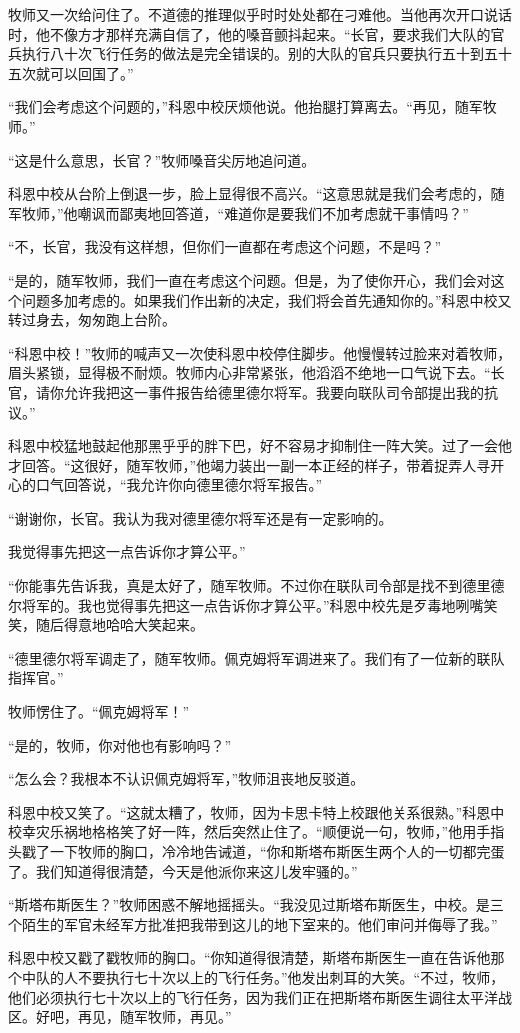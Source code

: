     牧师又一次给问住了。不道德的推理似乎时时处处都在刁难他。当他再次开口说话时，他不像方才那样充满自信了，他的嗓音颤抖起来。“长官，要求我们大队的官兵执行八十次飞行任务的做法是完全错误的。别的大队的官兵只要执行五十到五十五次就可以回国了。”

    “我们会考虑这个问题的，”科恩中校厌烦他说。他抬腿打算离去。“再见，随军牧师。”

    “这是什么意思，长官？”牧师嗓音尖厉地追问道。

    科恩中校从台阶上倒退一步，脸上显得很不高兴。“这意思就是我们会考虑的，随军牧师，”他嘲讽而鄙夷地回答道，“难道你是要我们不加考虑就干事情吗？”

    “不，长官，我没有这样想，但你们一直都在考虑这个问题，不是吗？”

    “是的，随军牧师，我们一直在考虑这个问题。但是，为了使你开心，我们会对这个问题多加考虑的。如果我们作出新的决定，我们将会首先通知你的。”科恩中校又转过身去，匆匆跑上台阶。

    “科恩中校！”牧师的喊声又一次使科恩中校停住脚步。他慢慢转过脸来对着牧师，眉头紧锁，显得极不耐烦。牧师内心非常紧张，他滔滔不绝地一口气说下去。“长官，请你允许我把这一事件报告给德里德尔将军。我要向联队司令部提出我的抗议。”

    科恩中校猛地鼓起他那黑乎乎的胖下巴，好不容易才抑制住一阵大笑。过了一会他才回答。“这很好，随军牧师，”他竭力装出一副一本正经的样子，带着捉弄人寻开心的口气回答说，“我允许你向德里德尔将军报告。”

    “谢谢你，长官。我认为我对德里德尔将军还是有一定影响的。

    我觉得事先把这一点告诉你才算公平。”

    “你能事先告诉我，真是太好了，随军牧师。不过你在联队司令部是找不到德里德尔将军的。我也觉得事先把这一点告诉你才算公平。”科恩中校先是歹毒地咧嘴笑笑，随后得意地哈哈大笑起来。

    “德里德尔将军调走了，随军牧师。佩克姆将军调进来了。我们有了一位新的联队指挥官。”

    牧师愣住了。“佩克姆将军！”

    “是的，牧师，你对他也有影响吗？”

    “怎么会？我根本不认识佩克姆将军，”牧师沮丧地反驳道。

    科恩中校又笑了。“这就太糟了，牧师，因为卡思卡特上校跟他关系很熟。”科恩中校幸灾乐祸地格格笑了好一阵，然后突然止住了。“顺便说一句，牧师，”他用手指头戳了一下牧师的胸口，冷冷地告诫道，“你和斯塔布斯医生两个人的一切都完蛋了。我们知道得很清楚，今天是他派你来这儿发牢骚的。”

    “斯塔布斯医生？”牧师困惑不解地摇摇头。“我没见过斯塔布斯医生，中校。是三个陌生的军官未经军方批准把我带到这儿的地下室来的。他们审问并侮辱了我。”

    科恩中校又戳了戳牧师的胸口。“你知道得很清楚，斯塔布斯医生一直在告诉他那个中队的人不要执行七十次以上的飞行任务。”他发出刺耳的大笑。“不过，牧师，他们必须执行七十次以上的飞行任务，因为我们正在把斯塔布斯医生调往太平洋战区。好吧，再见，随军牧师，再见。”

